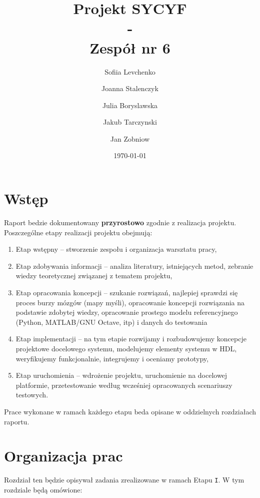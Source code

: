 \documentclass[a4paper,titleauthor]{mwart}
\title{{\Huge  Projekt SYCYF}\\ - \\{\Large Zespół nr 6}\\ }
\author{Sofiia Levchenko \and Joanna Stalenczyk \and Julia Boryslawska \and Jakub Tarczynski \and Jan Zobniow}
\date{\today}
\begin{document}
\maketitle
\tableofcontents

\section{Wstęp}
\label{sec:wstep}%

Raport bedzie dokumentowany \textbf{przyrostowo} zgodnie z realizacja projektu. Poszczególne etapy realizacji projektu obejmują: 

\renewcommand{\labelenumi}{\Roman{enumi}}
\begin{enumerate}\setlength{\itemsep}{0.2\baselineskip} 
	\item Etap wstępny – stworzenie zespołu i organizacja warsztatu pracy, 
	\item Etap zdobywania informacji – analiza literatury, istniejących metod, zebranie wiedzy teoretycznej związanej z tematem projektu, 
	\item Etap opracowania koncepcji – szukanie rozwiązań, najlepiej sprawdzi się proces burzy mózgów (mapy myśli), opracowanie koncepcji rozwiązania  na podstawie zdobytej wiedzy, opracowanie prostego modelu referencyjnego (Python, MATLAB/GNU Octave, itp) i danych do testowania  
	\item Etap implementacji – na tym etapie rozwijamy i rozbudowujemy koncepcje projektowe docelowego systemu, modelujemy elementy systemu w HDL, weryfikujemy funkcjonalnie, integrujemy i oceniamy prototypy, 
	\item Etap uruchomienia – wdrożenie projektu, uruchomienie na docelowej platformie, przetestowanie według wcześniej opracowanych scenariuszy testowych. 
\end{enumerate}

Prace wykonane w ramach każdego etapu beda opisane w oddzielnych rozdziałach raportu.

\section{Organizacja prac}
\label{sec:organizacja}

Rozdział ten będzie opisywał zadania zrealizowane w ramach Etapu \texttt{I}. W tym rozdziale będą omówione:
\end{document}
